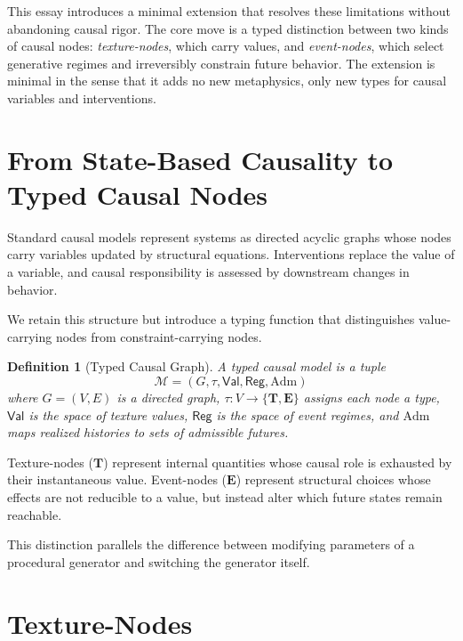 \documentclass[11pt]{article}
\newtheorem{definition}{Definition}
\newcommand{\Adm}{\mathrm{Adm}}
\newcommand{\Reg}{\mathsf{Reg}}
\newcommand{\Val}{\mathsf{Val}}
\begin{document}
This essay introduces a minimal extension that resolves these limitations without
abandoning causal rigor. The core move is a typed distinction between two kinds of
causal nodes: \emph{texture-nodes}, which carry values, and \emph{event-nodes},
which select generative regimes and irreversibly constrain future behavior. The
extension is minimal in the sense that it adds no new metaphysics, only new types
for causal variables and interventions.

\section{From State-Based Causality to Typed Causal Nodes}

Standard causal models represent systems as directed acyclic graphs whose nodes
carry variables updated by structural equations. Interventions replace the value
of a variable, and causal responsibility is assessed by downstream changes in
behavior.

We retain this structure but introduce a typing function that distinguishes
value-carrying nodes from constraint-carrying nodes.

\begin{definition}[Typed Causal Graph]
A typed causal model is a tuple
\[
\mathcal{M} = (G, \tau, \Val, \Reg, \Adm)
\]
where $G=(V,E)$ is a directed graph, $\tau:V\to\{\mathbf{T},\mathbf{E}\}$ assigns
each node a type, $\Val$ is the space of texture values, $\Reg$ is the space of
event regimes, and $\Adm$ maps realized histories to sets of admissible futures.
\end{definition}

Texture-nodes ($\mathbf{T}$) represent internal quantities whose causal role is
exhausted by their instantaneous value. Event-nodes ($\mathbf{E}$) represent
structural choices whose effects are not reducible to a value, but instead alter
which future states remain reachable.

This distinction parallels the difference between modifying parameters of a
procedural generator and switching the generator itself.

\section{Texture-Nodes}
\end{document}
